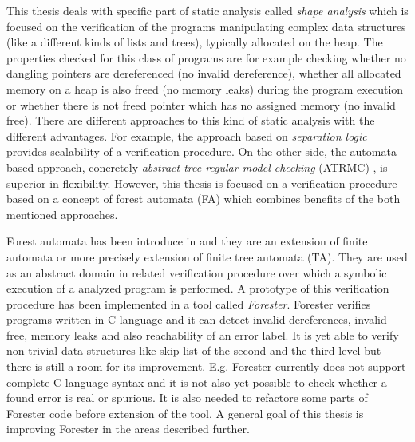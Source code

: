 This thesis deals with specific part of static analysis called \emph{shape analysis} which is focused on the verification of the programs manipulating
complex data structures (like a different kinds of lists and trees), typically allocated on the heap.
The properties checked for this class of programs are for example checking whether no dangling
pointers are dereferenced (no invalid dereference), whether all allocated memory on a heap is also freed (no memory leaks)
during the program execution or whether there is not freed pointer which has no assigned memory (no invalid free).
There are different approaches to this kind of static analysis with the different advantages.
For example, the approach based on \emph{separation logic} \cite{seplog,seplog07} provides scalability of a verification procedure.
On the other side, the automata based approach, concretely \emph{abstract tree regular model checking} (ATRMC) \cite{artmc}, is
superior in flexibility.
However, this thesis is focused on a verification procedure based on a concept of forest automata (FA) which
combines benefits of the both mentioned approaches.

Forest automata has been introduce in \cite{forester11,forester12} and they are an extension of finite automata or more precisely extension of finite tree automata (TA).
They are used as an abstract domain in related verification procedure over which a symbolic execution of a analyzed program is performed.
A prototype of this verification procedure has been implemented in a tool called \emph{Forester}.
Forester verifies programs written in C language and it can detect invalid dereferences, invalid free, memory leaks and also reachability of an error label.
It is yet able to verify non-trivial data structures like skip-list of the second and the third level
but there is still a room for its improvement.
E.g. Forester currently does not support complete C language syntax and
it is not also yet possible to check whether a found error is real or spurious.
It is also needed to refactore some parts of Forester code before extension of the tool.
A general goal of this thesis is improving Forester in the areas described further.


